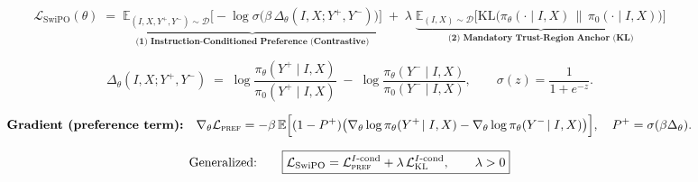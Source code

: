 


\vspace{-0.6em}
\begin{figure}[ht!]
\centering
\begin{tcolorbox}[
  enhanced,
  colback=white,
  colframe=black,
  boxrule=0.8pt,
  borderline={0.6pt}{1.6pt}{black},
  sharp corners,
  width=0.99\textwidth,
  left=3pt,
  right=3pt,
  top=3pt,
  bottom=2pt
]
\tiny

\[
\boxed{
\mathcal{L}_{\mathrm{SwiPO}}(\theta)
\;=\;
\underbrace{
\mathbb{E}_{(I,X,Y^+,Y^-)\sim \mathcal{D}}
\Big[
-\log \sigma\!\big(\beta\,\Delta_\theta(I,X;Y^+,Y^-)\big)
\Big]
}_{\textbf{(1) Instruction-Conditioned Preference (Contrastive)}}
\;+\;
\lambda\;
\underbrace{
\mathbb{E}_{(I,X)\sim \mathcal{D}}
\Big[
\mathrm{KL}\!\big(\pi_\theta(\cdot\mid I,X)\,\|\,\pi_0(\cdot\mid I,X)\big)
\Big]
}_{\textbf{(2) Mandatory Trust-Region Anchor (KL)}}
}
\]

\vspace{-0.5em}

\[
\Delta_\theta(I,X;Y^+,Y^-)
\;=\;
\log \frac{\pi_\theta(Y^+\mid I,X)}{\pi_0(Y^+\mid I,X)}\;-\;\log \frac{\pi_\theta(Y^-\mid I,X)}{\pi_0(Y^-\mid I,X)},
\qquad
\sigma(z)=\frac{1}{1+e^{-z}}.
\]

\vspace{-0.6em}

\[
\textbf{Gradient (preference term):}\quad
\nabla_\theta \mathcal{L}_{\textsc{pref}}
=
-\beta\,
\mathbb{E}\Big[
(1-P^+)\big(\nabla_\theta \log \pi_\theta(Y^+\!\mid I,X)-\nabla_\theta \log \pi_\theta(Y^-\!\mid I,X)\big)
\Big],
\quad
P^+=\sigma(\beta\Delta_\theta).
\]

\vspace{-0.35em}

\[
\text{Generalized:}\qquad
\boxed{
\mathcal{L}_{\mathrm{SwiPO}}
=
\mathcal{L}_{\textsc{pref}}^{I\text{-cond}}
+
\lambda\,\mathcal{L}_{\textsc{KL}}^{I\text{-cond}},
\qquad
\lambda>0
}
\]
\end{tcolorbox}


\end{figure}
